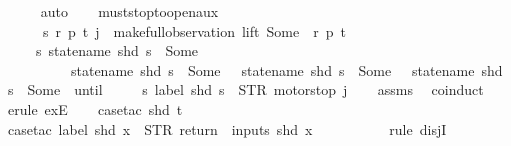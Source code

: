 \begin{isabellebody}
\ \ \ \ \isamarkupfalse%
\ auto\isanewline
\ \ \isamarkupfalse%
%
\endisatagproof
{\isafoldproof}%
%
\isadelimproof
\isanewline
%
\endisadelimproof
\isanewline
{}\isamarkupfalse%
\ must{\isacharunderscore}stop{\isacharunderscore}to{\isacharunderscore}open{\isacharunderscore}aux{}{\isacharcolon}\isanewline
\ \ \ \ \ {\isachardoublequoteopen}{\isasymexists}\ s\ r\ p\ t{\isachardot}\ j\ {\isacharequal}\ {\isacharparenleft}make{\isacharunderscore}full{\isacharunderscore}observation\ lift\ {\isacharparenleft}Some\ {}{\isacharparenright}\ r\ p\ t{\isacharparenright}{\isachardoublequoteclose}\isanewline
\ \ \ \ \ {\isachardoublequoteopen}{\isacharparenleft}{\isacharparenleft}{\isasymlambda}s{\isachardot}\ statename\ {\isacharparenleft}shd\ s{\isacharparenright}\ {\isasymnoteq}\ Some\ {}\ {\isasymand}\isanewline
\ \ \ \ \ \ \ \ \ \ statename\ {\isacharparenleft}shd\ s{\isacharparenright}\ {\isasymnoteq}\ Some\ {}\ {\isasymand}\ statename\ {\isacharparenleft}shd\ s{\isacharparenright}\ {\isasymnoteq}\ Some\ {}\ {\isasymand}\ statename\ {\isacharparenleft}shd\ s{\isacharparenright}\ {\isasymnoteq}\ Some\ {}{\isacharparenright}\ until\isanewline
\ \ \ \ \ {\isacharparenleft}{\isasymlambda}s{\isachardot}\ label\ {\isacharparenleft}shd\ s{\isacharparenright}\ {\isacharequal}\ STR\ {\isacharprime}{\isacharprime}motorstop{\isacharprime}{\isacharprime}{\isacharparenright}{\isacharparenright}\ j{\isachardoublequoteclose}\isanewline
%
\isadelimproof
\ \ %
\endisadelimproof
%
\isatagproof
{}\isamarkupfalse%
\ assms\ \isamarkupfalse%
\ coinduct\isanewline
\ \ \isamarkupfalse%
\ {\isacharparenleft}erule\ exE{\isacharparenright}{\isacharplus}\isanewline
\ \ \isamarkupfalse%
\ {\isacharparenleft}case{\isacharunderscore}tac\ {\isachardoublequoteopen}shd\ t{\isachardoublequoteclose}{\isacharparenright}\isanewline
\ \ \isamarkupfalse%
\ {\isacharparenleft}case{\isacharunderscore}tac\ {\isachardoublequoteopen}label\ {\isacharparenleft}shd\ x{\isacharparenright}\ {\isacharequal}\ STR\ {\isacharprime}{\isacharprime}return{\isacharprime}{\isacharprime}\ {\isasymand}\ inputs\ {\isacharparenleft}shd\ x{\isacharparenright}\ {\isacharequal}\ {\isacharbrackleft}{\isacharbrackright}{\isachardoublequoteclose}{\isacharparenright}\isanewline
\ \ \ \isamarkupfalse%
\isanewline
\ \ \ \isamarkupfalse%
\ {\isacharparenleft}rule\ disjI{}{\isacharparenright}\isanewline

\end{isabellebody}
